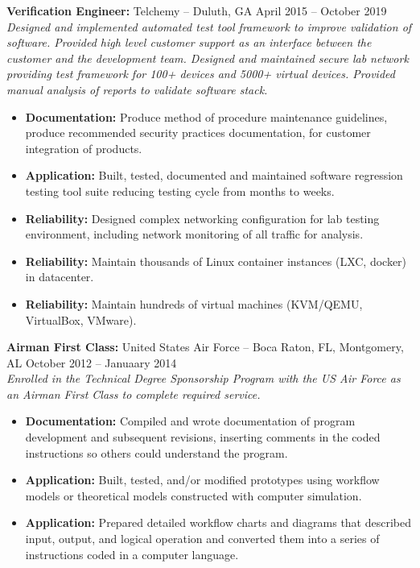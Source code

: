 \documentclass[11pt]{article}       %
\begin{document}
\begin{description}
\item\textbf{Verification Engineer:} {Telchemy} -- Duluth, GA \hfill April 2015 -- October 2019 \\
\textit{Designed and implemented automated test tool framework to improve validation of software. Provided high level customer support as an interface between the customer and the development team. Designed and maintained secure lab network providing test framework for 100+ devices and 5000+ virtual devices. Provided manual analysis of reports to validate software stack.} \\
\vspace{-6.5pt}
\begin{itemize}
  \item \textbf{Documentation:} Produce method of procedure maintenance guidelines, produce recommended security practices documentation, for customer integration of products.
  \item \textbf{Application:} Built, tested, documented and maintained software regression testing tool suite reducing testing cycle from months to weeks. 
  \item \textbf{Reliability:} Designed complex networking configuration for lab testing environment, including network monitoring of all traffic for analysis.
  \item \textbf{Reliability:} Maintain thousands of Linux container instances (LXC, docker) in datacenter.
  \item \textbf{Reliability:} Maintain hundreds of virtual machines (KVM/QEMU, VirtualBox, VMware).
\end{itemize}
\end{description}

\begin{description}
\item\textbf{Airman First Class:} {United States Air Force} -- Boca Raton, FL, Montgomery, AL \hfill October 2012 -- Januaary 2014 \\
\textit{Enrolled in the Technical Degree Sponsorship Program with the US Air Force as an Airman First Class to complete required service.} \\
\vspace{-6.5pt}
\begin{itemize}
  \item \textbf{Documentation:} Compiled and wrote documentation of program development and subsequent revisions, inserting comments in the coded instructions so others could understand the program.
  \item \textbf{Application:} Built, tested, and/or modified prototypes using workflow models or theoretical models constructed with computer simulation.
  \item \textbf{Application:} Prepared detailed workflow charts and diagrams that described input, output, and logical operation and converted them into a series of instructions coded in a computer language.
\end{itemize}
\end{description}
\end{document}
